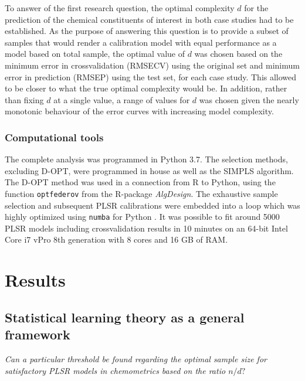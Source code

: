 \documentclass[preprint,12pt]{elsarticle}
\begin{document}
To answer of the first research question, the optimal complexity $d$ for the prediction of the chemical constituents of interest in both case studies had
to be established. As the purpose of answering this question is to provide a subset of samples that would render a calibration model with equal performance as a model based on total sample, the optimal value of $d$ was chosen based on the minimum error in crossvalidation (RMSECV) using the original set and minimum error in prediction (RMSEP) using the test set, for each case study. This allowed to be closer to what the true optimal complexity would be. In addition, rather than fixing $d$ at a single value, a range of values for $d$ was chosen given the nearly monotonic behaviour of the error curves with increasing model complexity. 

\subsubsection{Computational tools}

The complete analysis was programmed in Python 3.7. The selection methods, excluding D-OPT, were programmed in house as well as the SIMPLS algorithm. The D-OPT method was used in a connection from R to Python, using the function \texttt{optfederov} from the R-package \emph{AlgDesign}\cite{Wheeler2019}. The exhaustive sample selection and subsequent PLSR calibrations were embedded into a loop which was highly optimized using \texttt{numba} for Python \cite{Lam2015}. It was possible to fit around 5000 PLSR models including crossvalidation results in 10 minutes on an 64-bit Intel Core i7 vPro 8th generation with 8 cores and 16 GB of RAM. 



\section{Results}\label{results}

\subsection{Statistical learning theory as a general framework}\label{results:genframework}

\emph{Can a particular threshold be found regarding the optimal sample size for satisfactory PLSR models in chemometrics based on the ratio $n/d?$}
\end{document}
